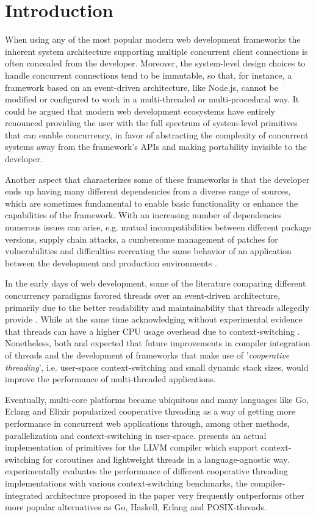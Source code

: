 \section{Introduction}
When using any of the most popular modern web development frameworks the inherent system architecture supporting multiple concurrent client connections is often concealed from the developer. Moreover, the system-level design choices to handle concurrent connections tend to be immutable, so that, for instance, a framework based on an event-driven architecture, like Node.js, cannot be modified or configured to work in a multi-threaded or multi-procedural way. It could be argued that modern web development ecosystems have entirely renounced providing the user with the full spectrum of system-level primitives that can enable concurrency, in favor of abstracting the complexity of concurrent systems away from the framework's APIs and making portability invisible to the developer.

Another aspect that characterizes some of these frameworks is that the developer ends up having many different dependencies from a diverse range of sources, which are sometimes fundamental to enable basic functionality or enhance the capabilities of the framework. With an increasing number of dependencies numerous issues can arise, e.g. mutual incompatibilities between different package versions, supply chain attacks, a cumbersome management of patches for vulnerabilities and difficulties recreating the same behavior of an application between the development and production environments \cite{2012PoulHenning}. 

In the early days of web development, some of the literature comparing different concurrency paradigms favored threads over an event-driven architecture, primarily due to the better readability and maintainability that threads allegedly provide \cite{2003Events}\cite{2005Threads}. While at the same time acknowledging without experimental evidence that threads can have a higher CPU usage overhead due to context-switching \cite{2003Events}. Nonetheless, both \cite{2003Events} and \cite{2005Threads} expected that future improvements in compiler integration of threads and the development of frameworks that make use of '\textit{cooperative threading}', i.e. user-space context-switching and small dynamic stack sizes, would improve the performance of multi-threaded applications.

Eventually, multi-core platforms became ubiquitous and many languages like Go, Erlang and Elixir popularized cooperative threading as a way of getting more performance in concurrent web applications through, among other methods, parallelization and context-switching in user-space. \cite{2013ContextSwitching} presents an actual implementation of primitives for the LLVM compiler which support context-switching for coroutines and lightweight threads in a language-agnostic way. \cite{2013ContextSwitching} experimentally evaluates the performance of different cooperative threading implementations with various context-switching benchmarks, the compiler-integrated architecture proposed in the paper very frequently outperforms other more popular alternatives as Go, Haskell, Erlang and POSIX-threads. 

